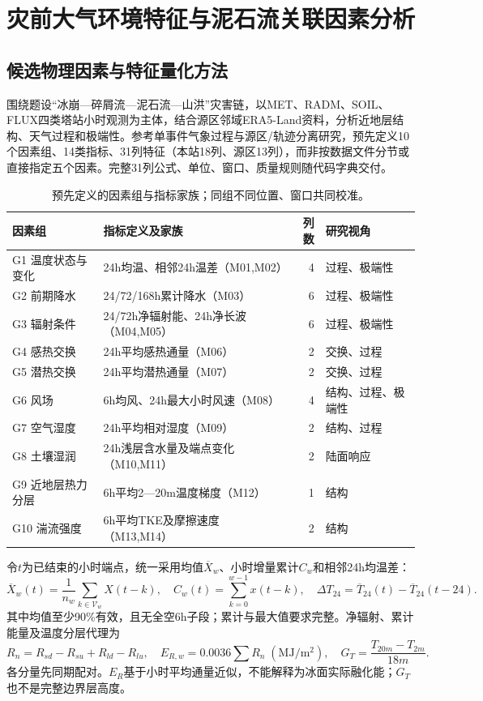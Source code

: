\section{灾前大气环境特征与泥石流关联因素分析}
\subsection{候选物理因素与特征量化方法}
围绕题设“冰崩—碎屑流—泥石流—山洪”灾害链，以MET、RADM、SOIL、FLUX四类塔站小时观测为主体，结合源区邻域ERA5-Land资料，分析近地层结构、天气过程和极端性。参考单事件气象过程与源区/轨迹分离研究\cite{Srivastava2022,Zhong2025}，预先定义10个因素组、14类指标、31列特征（本站18列、源区13列），而非按数据文件分节或直接指定五个因素。完整31列公式、单位、窗口、质量规则随代码字典交付。

\begin{table}[H]\centering\small
\caption{预先定义的因素组与指标家族；同组不同位置、窗口共同校准。}
\begin{tabularx}{\linewidth}{lXrl}\toprule 因素组 & 指标定义及家族 & 列数 & 研究视角\\\midrule
G1 温度状态与变化 & 24h均温、相邻24h温差（M01,M02） & 4 & 过程、极端性 \\
G2 前期降水 & 24/72/168h累计降水（M03） & 6 & 过程、极端性 \\
G3 辐射条件 & 24/72h净辐射能、24h净长波（M04,M05） & 6 & 过程、极端性 \\
G4 感热交换 & 24h平均感热通量（M06） & 2 & 交换、过程 \\
G5 潜热交换 & 24h平均潜热通量（M07） & 2 & 交换、过程 \\
G6 风场 & 6h均风、24h最大小时风速（M08） & 4 & 结构、过程、极端性 \\
G7 空气湿度 & 24h平均相对湿度（M09） & 2 & 结构、过程 \\
G8 土壤湿润 & 24h浅层含水量及端点变化（M10,M11） & 2 & 陆面响应 \\
G9 近地层热力分层 & 6h平均2—20m温度梯度（M12） & 1 & 结构 \\
G10 湍流强度 & 6h平均TKE及摩擦速度（M13,M14） & 2 & 结构 \\
\bottomrule\end{tabularx}\end{table}

令$t$为已结束的小时端点，统一采用均值$\overline X_w$、小时增量累计$C_w$和相邻24h均温差：
\begin{equation}
\overline X_w(t)=\frac{1}{n_w}\sum_{k\in\mathcal V_w}X(t-k),\quad C_w(t)=\sum_{k=0}^{w-1}x(t-k),\quad
\Delta T_{24}=\overline T_{24}(t)-\overline T_{24}(t-24).
\end{equation}
其中均值至少90\%有效，且无全空6h子段；累计与最大值要求完整。净辐射、累计能量及温度分层代理为
\begin{equation}
R_n=R_{sd}-R_{su}+R_{ld}-R_{lu},\quad E_{R,w}=0.0036\sum R_n\;(\mathrm{MJ/m^2}),\quad
G_T=\frac{T_{20m}-T_{2m}}{18m}.
\end{equation}
各分量先同期配对。$E_R$基于小时平均通量近似，不能解释为冰面实际融化能；$G_T$也不是完整边界层高度。

